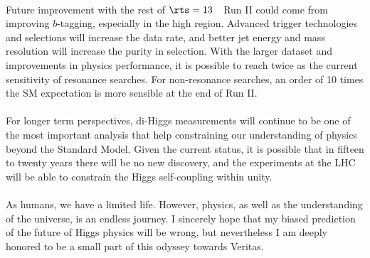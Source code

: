 \paragraph{}
Future improvement with the rest of $\rts = 13$~\TeV\ Run II could come from improving $b$-tagging, especially in the high \pt region. Advanced trigger technologies and selections will increase the data rate, and better jet energy and mass resolution will increase the purity in selection. With the larger dataset and improvements in physics performance, it is possible to reach twice as the current sensitivity of resonance searches. For non-resonance searches, an order of 10 times the SM expectation is more sensible at the end of Run II.


\paragraph{}
For longer term perspectives, di-Higgs measurements will continue to be one of the most important analysis that help constraining our understanding of physics beyond the Standard Model. Given the current status, it is possible that in fifteen to twenty years there will be no new discovery, and the experiments at the LHC will be able to constrain the Higgs self-coupling within unity. 

\paragraph{}
As humans, we have a limited life. However, physics, as well as the understanding of the universe, is an endless journey. I sincerely hope that my biased prediction of the future of Higgs physics will be wrong, but nevertheless I am deeply honored to be a small part of this odyssey towards Veritas.